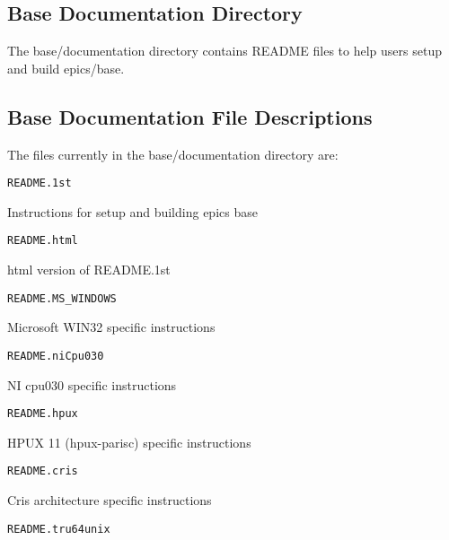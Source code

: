 \subsection{Base Documentation Directory}

The base/documentation directory contains README files to help users setup and build epics/base.

\subsection{Base Documentation File Descriptions}

The files currently in the base/documentation directory are:

\begin{verbatim}README.1st
\end{verbatim}\begin{description}\item Instructions for setup and building epics base

\end{description}\begin{verbatim}README.html
\end{verbatim}\begin{description}\item html version of README.1st

\end{description}\begin{verbatim}README.MS_WINDOWS
\end{verbatim}\begin{description}\item Microsoft WIN32 specific instructions

\end{description}\begin{verbatim}README.niCpu030
\end{verbatim}\begin{description}\item NI cpu030 specific instructions

\end{description}\begin{verbatim}README.hpux
\end{verbatim}\begin{description}\item {}HPUX 11 (hpux-parisc) specific instructions

\end{description}\begin{verbatim}README.cris
\end{verbatim}\begin{description}\item Cris architecture specific instructions

\end{description}\begin{verbatim}README.tru64unix
\end{verbatim}
